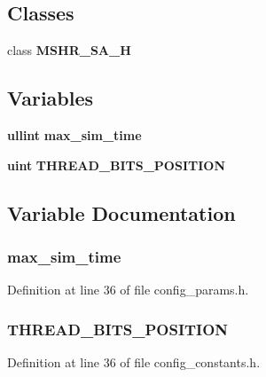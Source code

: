 \subsection*{Classes}
\begin{CompactItemize}
\item 
class {\bf MSHR\_\-SA\_\-H}
\end{CompactItemize}
\subsection*{Variables}
\begin{CompactItemize}
\item 
{\bf ullint} {\bf max\_\-sim\_\-time}
\item 
{\bf uint} {\bf THREAD\_\-BITS\_\-POSITION}
\end{CompactItemize}


\subsection{Variable Documentation}
\subsubsection[{max\_\-sim\_\-time}]{ {\bf max\_\-sim\_\-time}}\label{mshr__standalone_8h_a340b2edbc363c0c05db68a8f5212f0f}




Definition at line 36 of file config\_\-params.h.
\subsubsection[{THREAD\_\-BITS\_\-POSITION}]{ {\bf THREAD\_\-BITS\_\-POSITION}}\label{mshr__standalone_8h_08515d4ff3a55a88340b5e2abfe7584f}




Definition at line 36 of file config\_\-constants.h.